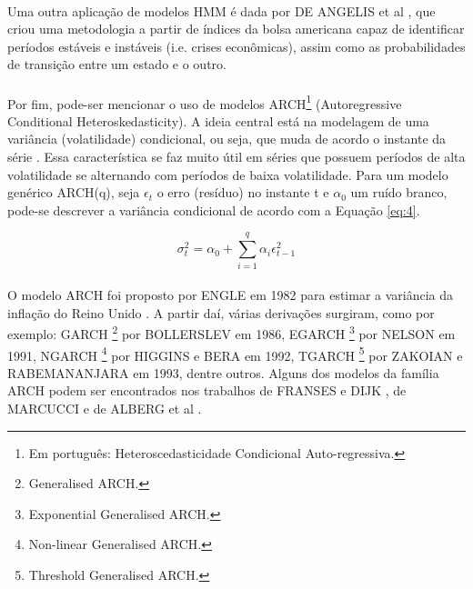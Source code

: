 \paragraph{} Uma outra aplicação de modelos HMM é dada por DE ANGELIS et al \cite{de2013dynamic}, que criou uma metodologia a partir de índices da bolsa americana capaz de identificar períodos estáveis e instáveis (i.e. crises econômicas), assim como as probabilidades de transição entre um estado e o outro.

\paragraph{} Por fim, pode-ser mencionar o uso de modelos ARCH\footnote{Em português: Heteroscedasticidade Condicional Auto-regressiva.} (Autoregressive Conditional Heteroskedasticity). A ideia central está na modelagem de uma variância (volatilidade) condicional, ou seja, que muda de acordo o instante da série \cite{enders2008applied}. Essa característica se faz muito útil em séries que possuem períodos de alta volatilidade se alternando com períodos de baixa volatilidade. Para um modelo genérico ARCH(q), seja \begin{math}\epsilon_t\end{math} o erro (resíduo) no instante t e \begin{math}\alpha_0\end{math} um ruído branco, pode-se descrever a variância condicional de acordo com a Equação \ref{eq:4}.

\begin{equation} \label{eq:4}
\sigma_t^2 = \alpha_0 + \sum_{i=1}^{q} \alpha_i\epsilon_{t-1}^{2}
\end{equation}

\paragraph{} O modelo ARCH foi proposto por ENGLE em 1982 para estimar a variância da inflação do Reino Unido \cite{engle1982autoregressive}. A partir daí, várias derivações surgiram, como por exemplo: GARCH \footnote{Generalised ARCH.} por BOLLERSLEV \cite{bollerslev1986generalized} em 1986, EGARCH \footnote{Exponential Generalised ARCH.} por NELSON em 1991, NGARCH \footnote{Non-linear Generalised ARCH.} por HIGGINS e BERA\cite{higgins1992class} em 1992, TGARCH \footnote{Threshold Generalised ARCH.} por ZAKOIAN e RABEMANANJARA \cite{rabemananjara1993threshold} em 1993, dentre outros. Alguns dos modelos da família ARCH podem ser encontrados nos trabalhos de FRANSES e DIJK \cite{franses1996forecasting}, de MARCUCCI \cite{marcucci2005forecasting} e de ALBERG et al \cite{alberg2008estimating}.


